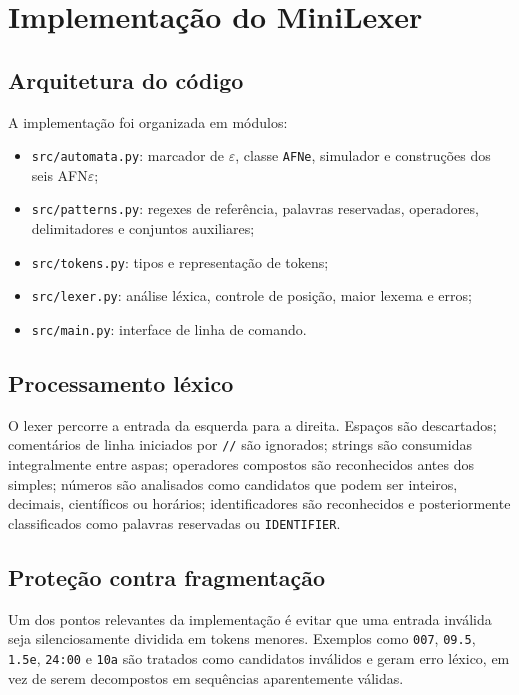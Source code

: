 \chapter{Implementação do MiniLexer}

\section{Arquitetura do código}

A implementação foi organizada em módulos:

\begin{itemize}
    \item \texttt{src/automata.py}: marcador de $\varepsilon$, classe \texttt{AFNe}, simulador e construções dos seis AFN$\varepsilon$;
    \item \texttt{src/patterns.py}: regexes de referência, palavras reservadas, operadores, delimitadores e conjuntos auxiliares;
    \item \texttt{src/tokens.py}: tipos e representação de tokens;
    \item \texttt{src/lexer.py}: análise léxica, controle de posição, maior lexema e erros;
    \item \texttt{src/main.py}: interface de linha de comando.
\end{itemize}

\section{Processamento léxico}

O lexer percorre a entrada da esquerda para a direita. Espaços são descartados; comentários de linha iniciados por \texttt{//} são ignorados; strings são consumidas integralmente entre aspas; operadores compostos são reconhecidos antes dos simples; números são analisados como candidatos que podem ser inteiros, decimais, científicos ou horários; identificadores são reconhecidos e posteriormente classificados como palavras reservadas ou \texttt{IDENTIFIER}.

\section{Proteção contra fragmentação}

Um dos pontos relevantes da implementação é evitar que uma entrada inválida seja silenciosamente dividida em tokens menores. Exemplos como \texttt{007}, \texttt{09.5}, \texttt{1.5e}, \texttt{24:00} e \texttt{10a} são tratados como candidatos inválidos e geram erro léxico, em vez de serem decompostos em sequências aparentemente válidas.

